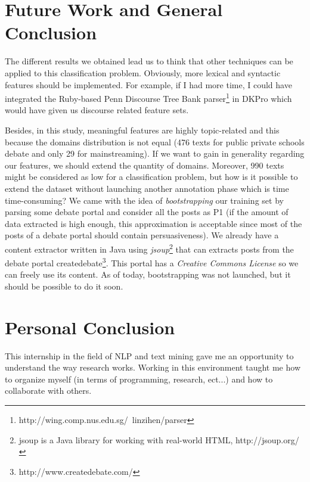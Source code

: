 \section{Future Work and General Conclusion}
The different results we obtained lead us to think that other techniques can be applied to this classification problem. Obviously, more lexical and syntactic features should be implemented. For example, if I had more time, I could have integrated the Ruby-based Penn Discourse Tree Bank\cite{NLE:9163968} parser\footnote{http://wing.comp.nus.edu.sg/~linzihen/parser} in DKPro which would have given us discourse related feature sets. 

Besides, in this study, meaningful features are highly topic-related and this because the domains distribution is not equal (476 texts for public private schools debate and only 29 for mainstreaming). If we want to gain in generality regarding our features, we should extend the quantity of domains. Moreover, 990 texts might be considered as low for a classification problem, but how is it possible to extend the dataset without launching another annotation phase which is time time-consuming? We came with the idea of \emph{bootstrapping} our training set by parsing some debate portal and consider all the posts as P1 (if the amount of data extracted is high enough, this approximation is acceptable since most of the posts of a debate portal should contain persuasiveness). We already have a content extractor written in Java using \emph{jsoup}\footnote{jsoup is a Java library for working with real-world HTML, http://jsoup.org/} that can extracts posts from the debate portal createdebate\footnote{http://www.createdebate.com/}. This portal has a \emph{Creative Commons License} so we can freely use its content. As of today, bootstrapping was not launched, but it should be possible to do it soon.

\section{Personal Conclusion}
This internship in the field of NLP and text mining gave me an opportunity to understand the way research works. Working in this environment taught me how to organize myself (in terms of programming, research, ect...) and how to collaborate with others.
